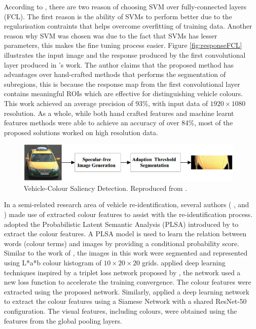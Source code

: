 According to , there are two reason of choosing SVM over fully-connected layers (FCL). The first reason is the ability of SVMs to perform better due to the regularisation contraints that helps overcome overfitting of training data. Another reason why SVM was chosen was due to the fact that SVMs has lesser parameters, this makes the fine tuning process easier. 
Figure \ref{fig:responseFCL} illustrates the input image and the response produced by the first convolutional layer produced in 's work. The author claims that the proposed method has advantages over hand-crafted methods that performs the segmentation of subregions, this is because the response map from the first convolutional layer contains meaningful ROIs which are effective for distinguishing vehicle colours. This work achieved an average precision of 93\%, with input data of $1920 \times 1080$ resolution.  
As a whole, while both hand crafted features and machine learnt features methods were able to achieve an accuracy of over 84\%, most of the proposed solutions worked on high resolution data.   

\begin{figure}[hbt!]\centering
\includegraphics[width=1\textwidth]{image/lit/salient1.png}
\caption[Vehicle-Colour Saliency Detection]{Vehicle-Colour Saliency Detection. Reproduced from .}
\label{fig:Colorsaliency}
\end{figure}

In a semi-related research area of vehicle re-identification, several authors ( ,  and ) made use of extracted colour features to assist with the re-identification process.  adopted the Probabilistic Latent Semantic Analysis (PLSA) introduced by  to extract the colour features. A PLSA model is used to learn the relation between words (colour terms) and images by providing a conditional probability score. Similar to the work of , the images in this work were segmented and represented using L*a*b colour histogram of $10 \times 20 \times 20$ grids.  applied deep learning techniques inspired by a triplet loss network proposed by , the network used a new loss function to accelerate the training convergence. The colour features were extracted using the proposed network. Similarly,  applied a deep learning network to extract the colour features using a Siamese Network with a shared ResNet-50 configuration. The visual features, including colours, were obtained using the features from the global pooling layers.

